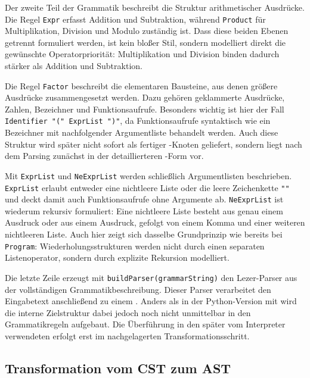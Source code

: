 Der zweite Teil der Grammatik beschreibt die Struktur arithmetischer Ausdrücke. Die Regel \texttt{Expr} erfasst Addition und Subtraktion, während \texttt{Product} für Multiplikation, Division und Modulo zuständig ist. Dass diese beiden Ebenen getrennt formuliert werden, ist kein bloßer Stil, sondern modelliert direkt die gewünschte Operatorpriorität: Multiplikation und Division binden dadurch stärker als Addition und Subtraktion.

Die Regel \texttt{Factor} beschreibt die elementaren Bausteine, aus denen größere Ausdrücke zusammengesetzt werden. Dazu gehören geklammerte Ausdrücke, Zahlen, Bezeichner und Funktionsaufrufe. Besonders wichtig ist hier der Fall \texttt{Identifier "(" ExprList ")"}, da Funktionsaufrufe syntaktisch wie ein Bezeichner mit nachfolgender Argumentliste behandelt werden. Auch diese Struktur wird später nicht sofort als fertiger -Knoten geliefert, sondern liegt nach dem Parsing zunächst in der detaillierteren -Form vor.

Mit \texttt{ExprList} und \texttt{NeExprList} werden schließlich Argumentlisten beschrieben. \texttt{ExprList} erlaubt entweder eine nichtleere Liste oder die leere Zeichenkette \texttt{""} und deckt damit auch Funktionsaufrufe ohne Argumente ab. \texttt{NeExprList} ist wiederum rekursiv formuliert: Eine nichtleere Liste besteht aus genau einem Ausdruck oder aus einem Ausdruck, gefolgt von einem Komma und einer weiteren nichtleeren Liste. Auch hier zeigt sich dasselbe Grundprinzip wie bereits bei \texttt{Program}: Wiederholungsstrukturen werden nicht durch einen separaten Listenoperator, sondern durch explizite Rekursion modelliert.

Die letzte Zeile erzeugt mit \texttt{buildParser(grammarString)} den Lezer-Parser aus der vollständigen Grammatikbeschreibung. Dieser Parser verarbeitet den Eingabetext anschließend zu einem . Anders als in der Python-Version mit \emph{} wird die interne Zielstruktur dabei jedoch noch nicht unmittelbar in den Grammatikregeln aufgebaut. Die Überführung in den später vom Interpreter verwendeten  erfolgt erst im nachgelagerten Transformationsschritt.

\subsection{Transformation vom CST zum AST}

